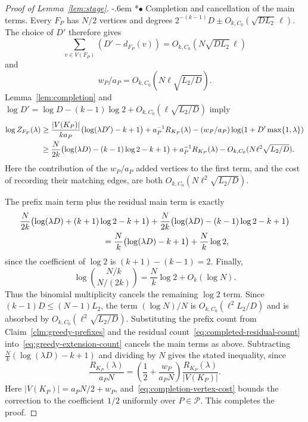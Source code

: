 \documentclass[11pt,reqno]{amsart}
\makeatletter
\numberwithin{equation}{section}
\renewcommand{\paragraph}{\@startsection{paragraph}{4}%
    \z@{.75\linespacing\@plus.2\linespacing\@minus.1\linespacing}%
    {-.6em}%
    {\normalfont\bfseries}}
\newcommand{\proofparagraph}[1]{%
    \paragraph*{$\bullet$ #1}\ignorespaces}
\theoremstyle{plain}
\theoremstyle{definition}
\makeatother
\begin{document}
\begin{proof}[Proof of Lemma~\ref{lem:stage}]
    \proofparagraph{Completion and cancellation of the main terms.}
    Every $F_P$ has $N/2$ vertices and degrees $2^{-(k-1)}D\pm O_{k,C_0}(\sqrt{DL_2}\,\ell)$.
    The choice of $D'$ therefore gives
    \[
        \sum_{v\in V(F_P)}(D'-d_{F_P}(v))=O_{k,C_0}(N\sqrt{DL_2}\,\ell)
    \]
    and
    \begin{equation}\label{eq:completion-vertex-cost}
        w_P/a_P=O_{k,C_0}(N\ell\sqrt{L_2/D}).
    \end{equation}
    Lemma~\ref{lem:completion} and $\log D'=\log D-(k-1)\log2+O_{k,C_0}(\ell\sqrt{L_2/D})$ imply
    \begin{align}
        \log Z_{F_P}(\lambda) & \ge \frac{|V(K_P)|}{ka_P}\bigl(\log(\lambda D')-k+1\bigr)+a_P^{-1}R_{K_P}(\lambda) -(w_P/a_P)\log(1+D'\max\{1,\lambda\})\notag\\
        & \ge\frac N{2k}\bigl(\log(\lambda D)-(k-1)\log2-k+1\bigr) +a_P^{-1}R_{K_P}(\lambda)-O_{k,C_0}(N\ell^2\sqrt{L_2/D}).
    \label{eq:completed-residual-count}
    \end{align}
    Here the contribution of the $w_P/a_P$ added vertices to the first term, and the cost of recording their matching edges, are both $O_{k,C_0}(N\ell^2\sqrt{L_2/D})$.

    The prefix main term plus the residual main term is exactly
    \begin{align*}
        & \frac N{2k}\bigl(\log(\lambda D)+(k+1)\log2-k+1\bigr) +\frac N{2k}\bigl(\log(\lambda D)-(k-1)\log2-k+1\bigr)\\
        & \hspace{35mm}=\frac Nk\bigl(\log(\lambda D)-k+1\bigr)+\frac Nk\log2,
    \end{align*}
    since the coefficient of $\log2$ is $(k+1)-(k-1)=2$.
    Finally,
    \[
        \log\binom{N/k}{N/(2k)}=\frac Nk\log2+O_k(\log N).
    \]
    Thus the binomial multiplicity cancels the remaining $\log2$ term.
    Since $(k-1)D\le(N-1)L_2$, the term $(\log N)/N$ is $O_{k,C_0}(\ell^2L_2/D)$ and is absorbed by $O_{k,C_0}(\ell^2\sqrt{L_2/D})$.
    Substituting the prefix count from Claim~\ref{clm:greedy-prefixes} and the residual count~\eqref{eq:completed-residual-count} into~\eqref{eq:greedy-extension-count} cancels the main terms as above.
    Subtracting $\frac Nk(\log(\lambda D)-k+1)$ and dividing by $N$ gives the stated inequality, since
    \[
        \frac{R_{K_P}(\lambda)}{a_PN}
        =\left(\frac12+\frac{w_P}{a_PN}\right)
        \frac{R_{K_P}(\lambda)}{|V(K_P)|}.
    \]
    Here $|V(K_P)|=a_PN/2+w_P$, and~\eqref{eq:completion-vertex-cost} bounds the correction to the coefficient $1/2$ uniformly over $P\in\mathcal P$.
    This completes the proof.
\end{proof}
\end{document}
